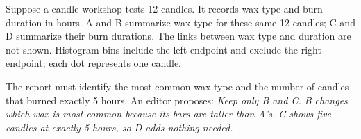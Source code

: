 \documentclass[11pt]{article}
\begin{document}


Suppose a candle workshop tests 12 candles. It records wax type and burn duration in hours. A and B summarize wax type for these same 12 candles; C and D summarize their burn durations. The links between wax type and duration are not shown. Histogram bins include the left endpoint and exclude the right endpoint; each dot represents one candle.\par\smallskip
The report must identify the most common wax type and the number of candles that burned exactly 5 hours. An editor proposes: \emph{Keep only B and C. B changes which wax is most common because its bars are taller than A's. C shows five candles at exactly 5 hours, so D adds nothing needed.}\par
\end{document}
